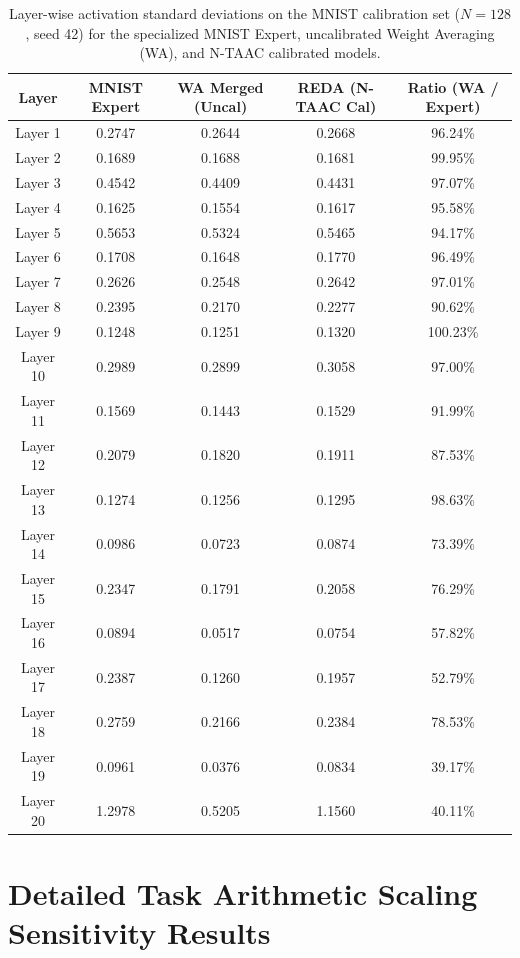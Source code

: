 \documentclass{article}
\theoremstyle{plain}
\theoremstyle{definition}
\theoremstyle{remark}
\begin{document}
\begin{table}[h]
  \caption{Layer-wise activation standard deviations on the MNIST calibration set ($N=128$, seed 42) for the specialized MNIST Expert, uncalibrated Weight Averaging (WA), and N-TAAC calibrated models.}
  \label{tab:layer_stds}
  \centering
  \small
  \begin{tabular}{ccccc}
    \toprule
    Layer & MNIST Expert & WA Merged (Uncal) & REDA (N-TAAC Cal) & Ratio (WA / Expert) \\
    \midrule
    Layer 1  & 0.2747 & 0.2644 & 0.2668 & 96.24\% \\
    Layer 2  & 0.1689 & 0.1688 & 0.1681 & 99.95\% \\
    Layer 3  & 0.4542 & 0.4409 & 0.4431 & 97.07\% \\
    Layer 4  & 0.1625 & 0.1554 & 0.1617 & 95.58\% \\
    Layer 5  & 0.5653 & 0.5324 & 0.5465 & 94.17\% \\
    Layer 6  & 0.1708 & 0.1648 & 0.1770 & 96.49\% \\
    Layer 7  & 0.2626 & 0.2548 & 0.2642 & 97.01\% \\
    Layer 8  & 0.2395 & 0.2170 & 0.2277 & 90.62\% \\
    Layer 9  & 0.1248 & 0.1251 & 0.1320 & 100.23\% \\
    Layer 10 & 0.2989 & 0.2899 & 0.3058 & 97.00\% \\
    Layer 11 & 0.1569 & 0.1443 & 0.1529 & 91.99\% \\
    Layer 12 & 0.2079 & 0.1820 & 0.1911 & 87.53\% \\
    Layer 13 & 0.1274 & 0.1256 & 0.1295 & 98.63\% \\
    Layer 14 & 0.0986 & 0.0723 & 0.0874 & 73.39\% \\
    Layer 15 & 0.2347 & 0.1791 & 0.2058 & 76.29\% \\
    Layer 16 & 0.0894 & 0.0517 & 0.0754 & 57.82\% \\
    Layer 17 & 0.2387 & 0.1260 & 0.1957 & 52.79\% \\
    Layer 18 & 0.2759 & 0.2166 & 0.2384 & 78.53\% \\
    Layer 19 & 0.0961 & 0.0376 & 0.0834 & 39.17\% \\
    Layer 20 & 1.2978 & 0.5205 & 1.1560 & 40.11\% \\
    \bottomrule
  \end{tabular}
\end{table}

\section{Detailed Task Arithmetic Scaling Sensitivity Results}
\label{app:lambda_table}
\end{document}
